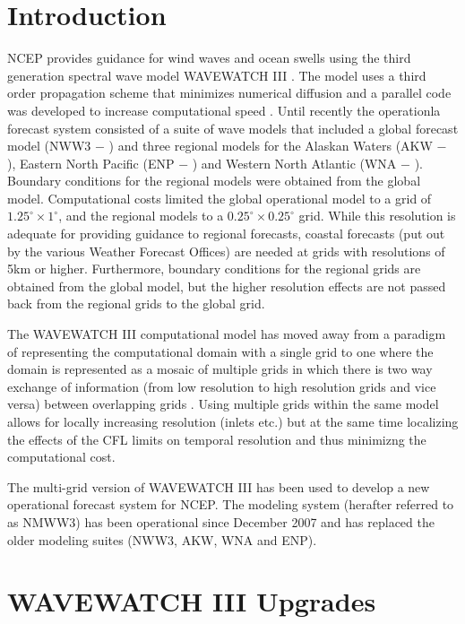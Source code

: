 \documentclass[12pt]{article}
\newcommand{\degree}{^\circ}
\begin{document}
\section{Introduction}
NCEP provides guidance for wind waves and ocean swells using the third
generation spectral wave model WAVEWATCH III\texttrademark
\cite[]{tolman-02}. The model uses a third order propagation scheme
that minimizes numerical diffusion and a parallel code was developed
to increase computational speed \cite[]{tolman-02d}. Until recently
the operationla forecast system consisted of a suite of wave models
that included a global forecast model (NWW3 $-$
\citealt{tolmanetal-02}) and three regional models for the Alaskan
Waters (AKW $-$ \citealt{chao-akw}), Eastern North Pacific (ENP $-$
\citealt{chao-enp}) and Western North Atlantic (WNA $-$
\citealt{chao-wna}). Boundary conditions for the regional models were
obtained from the global model. Computational costs limited the global
operational model to a grid of $1.25\degree \times 1\degree$, and the
regional models to a $0.25\degree \times 0.25\degree$ grid. While this
resolution is adequate for providing guidance to regional forecasts,
coastal forecasts (put out by the various Weather Forecast Offices)
are needed at grids with resolutions of 5km or higher. Furthermore,
boundary conditions for the regional grids are obtained from the
global model, but the higher resolution effects are not passed back
from the regional grids to the global grid.

The WAVEWATCH III computational model has moved away from a paradigm
of representing the computational domain with a single grid to one
where the domain is represented as a mosaic of multiple grids in which
there is two way exchange of information (from low resolution to high
resolution grids and vice versa) between overlapping grids
\cite[]{tolman-08}. Using multiple grids within the same model allows
for locally increasing resolution (inlets etc.) but at the same time
localizing the effects of the CFL limits on temporal resolution and
thus minimizng the computational cost.

The multi-grid version of WAVEWATCH III has been used to develop a new
operational forecast system for NCEP. The modeling system (herafter
referred to as NMWW3) has been operational since December 2007 and has
replaced the older modeling suites (NWW3, AKW, WNA and ENP).


\section{WAVEWATCH III Upgrades}
\end{document}
